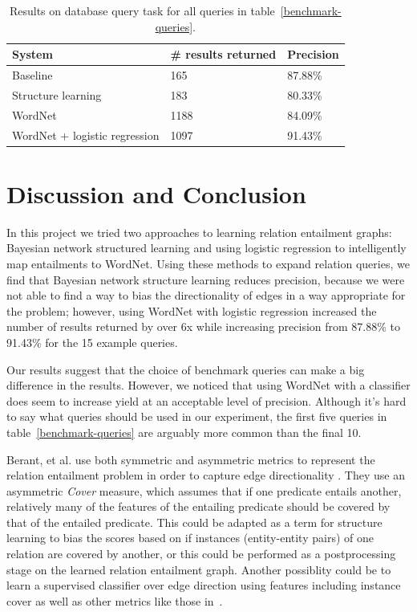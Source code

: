 \documentclass{article}
\begin{document}
\begin{table}[h]
  \caption{Results on database query task for all queries in table~\ref{benchmark-queries}.}\label{combined-results}
  \begin{center}
    \begin{tabular}{l l l}
      \toprule
      System & \# results returned & Precision\\
      \midrule
      Baseline & 165 & 87.88\%\\
      Structure learning & 183 & 80.33\%\\
      WordNet & 1188 & 84.09\% \\
      WordNet + logistic regression & 1097 & 91.43\%\\
      \bottomrule
    \end{tabular}
  \end{center}
\end{table}

\section{Discussion and Conclusion}

In this project we tried two approaches to learning relation entailment graphs: Bayesian network structured learning and using logistic regression to intelligently map entailments to WordNet. Using these methods to expand relation queries, we find that Bayesian network structure learning reduces precision, because we were not able to find a way to bias the directionality of edges in a way appropriate for the problem; however, using WordNet with logistic regression increased the number of results returned by over 6x while increasing precision from 87.88\% to 91.43\% for the 15 example queries.

Our results suggest that the choice of benchmark queries can make a big difference in the results. However, we noticed that using WordNet with a classifier does seem to increase yield at an acceptable level of precision. Although it's hard to say what queries should be used in our experiment, the first five queries in table~\ref{benchmark-queries} are arguably more common than the final 10.

Berant, et al. use both symmetric and asymmetric metrics to represent the relation entailment problem in order to capture edge directionality \cite{Berant:2012:LER:2122944.2122947}. They use an asymmetric \textit{Cover} measure, which assumes that if one predicate entails another, relatively many of the features of the entailing predicate should be covered by that of the entailed predicate. This could be adapted as a term for structure learning to bias the scores based on if instances (entity-entity pairs) of one relation are covered by another, or this could be performed as a postprocessing stage on the learned relation entailment graph. Another possiblity could be to learn a supervised classifier over edge direction using features including instance cover as well as other metrics like those in~\cite{Berant:2012:LER:2122944.2122947}.
\end{document}
